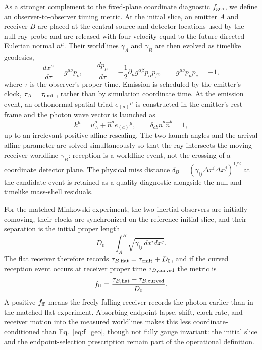 \documentclass[twocolumn,floatfix,aps,prd,nofootinbib]{revtex4-2}
\begin{document}
As a stronger complement to the fixed-plane coordinate diagnostic
$f_{\rm geo}$, we define an observer-to-observer timing metric. At the initial
slice, an emitter $A$ and receiver $B$ are placed at the central source and
detector locations used by the null-ray probe and are released with four-velocity
equal to the future-directed Eulerian normal $n^\mu$. Their worldlines
$\gamma_A$ and $\gamma_B$ are then evolved as timelike geodesics,
\begin{equation}
\frac{dx^\mu}{d\tau}=g^{\mu\nu}p_\nu,\qquad
\frac{dp_\mu}{d\tau}
=-\frac{1}{2}\partial_\mu g^{\alpha\beta}p_\alpha p_\beta,\qquad
g^{\mu\nu}p_\mu p_\nu=-1,
\label{eq:timelike_observers}
\end{equation}
where $\tau$ is the observer's proper time. Emission is scheduled by the
emitter's clock, $\tau_A=\tau_{\rm emit}$, rather than by simulation coordinate
time. At the emission event, an orthonormal spatial triad
$e_{(a)}{}^\mu$ is constructed in the emitter's rest frame and the photon wave
vector is launched as
\begin{equation}
k^\mu=u_A^\mu+\hat n^a e_{(a)}{}^\mu,\qquad
\delta_{ab}\hat n^a\hat n^b=1,
\label{eq:freefall_null_launch}
\end{equation}
up to an irrelevant positive affine rescaling. The two launch angles and the
arrival affine parameter are solved simultaneously so that the ray intersects
the moving receiver worldline $\gamma_B$: reception is a worldline event, not
the crossing of a coordinate detector plane. The physical miss distance
$\delta_B=(\gamma_{ij}\Delta x^i\Delta x^j)^{1/2}$ at the candidate event is
retained as a quality diagnostic alongside the null and timelike mass-shell
residuals.

For the matched Minkowski experiment, the two inertial observers are initially
comoving, their clocks are synchronized on the reference initial slice, and
their separation is the initial proper length
\begin{equation}
D_0=\int_A^B\sqrt{\gamma_{ij}\,dx^i dx^j}.
\label{eq:freefall_initial_separation}
\end{equation}
The flat receiver therefore records
$\tau_{B,\rm flat}=\tau_{\rm emit}+D_0$, and if the curved reception event
occurs at receiver proper time $\tau_{B,\rm curved}$ the metric is
\begin{equation}
f_{\rm ff}
=\frac{\tau_{B,\rm flat}-\tau_{B,\rm curved}}
       {D_0}.
\label{eq:freefall_metric}
\end{equation}
A positive $f_{\rm ff}$ means the freely falling receiver records the photon
earlier than in the matched flat experiment. Absorbing endpoint lapse, shift,
clock rate, and receiver motion into the measured worldlines makes this less
coordinate-conditioned than Eq.~\eqref{eq:f_geo}, though not fully gauge
invariant: the initial slice and the endpoint-selection prescription remain
part of the operational definition.
\end{document}
